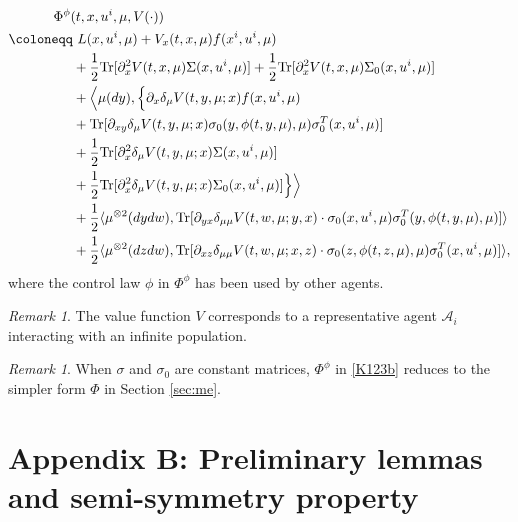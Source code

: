 \documentclass{amsart}
\theoremstyle{definition}
\theoremstyle{remark}
\newtheorem{remark}[theorem]{Remark}
\def\cal{\mathcal}
\numberwithin{equation}{section}
\begin{document}
\begin{align}
&\hskip -0.5cm \Phi^\phi(t, x, u^i,\mu,   V(\cdot) )\nonumber\\
  \coloneqq &\   L(x, u^i, \mu)+
 V_x (t, x, \mu)
f(x^i, u^i, \mu)\nonumber\\
& + \frac{1}{2} {\rm Tr}
[\partial^2_{x} V(t, x, \mu) \Sigma  (x,u^i,\mu  ) ]+ \frac{1}{2} {\rm Tr}
[\partial^2_{x} V(t, x, \mu) \Sigma_0  (x,u^i,\mu  ) ] \nonumber \\
&+\Big\langle \mu(dy), \Big\{ \partial_{x} \delta_\mu V(t, y, \mu; x) f(x,  u^i,\mu) \nonumber  \\
&  +{\rm Tr}[ \partial_{xy}\delta_\mu V(t,y,\mu;x)
\sigma_0(y, \phi(t,y,\mu),\mu)\sigma_0^T(x, u^i, \mu) ]\nonumber \\
& + \frac{1}{2} {\rm Tr} [\partial^2_{x} \delta_\mu V (t, y, \mu; x)\Sigma(x,u^i,\mu  )]\nonumber\\
& +  \frac{1}{2} {\rm Tr} [\partial_{x}^2 \delta_\mu V (t, y, \mu; x)\Sigma_0(x,u^i,\mu  )]\Big \}\Big\rangle\nonumber\\
&+\frac{1}{2} \langle \mu^{\otimes2}(dydw),
{\rm Tr}[\partial_{yx}\delta_{\mu\mu} V (t, w, \mu; y,x) \cdot
\sigma_0(x,u^i,\mu)\sigma^T_0(y,\phi(t,y,\mu),\mu)]\rangle \nonumber \\
&+\frac{1}{2}\langle \mu^{\otimes2}(dzdw), {\rm Tr}[\partial_{xz}\delta_{\mu\mu} V (t, w, \mu; x,z) \cdot \sigma_0(z,\phi(t,z,\mu),\mu)\sigma_0^T(x,u^i,\mu)]\rangle,\label{K123b}
\end{align}
where the control law $\phi$ in $\Phi^\phi$ has been used by other agents.







\begin{remark}
 The value function $V$ corresponds to a representative agent  ${\cal A}_i$ interacting with an infinite population.
  \end{remark}

\begin{remark}
When $\sigma$ and $\sigma_0$ are constant matrices, $\Phi^\phi$ in \eqref{K123b} reduces to the simpler form $\Phi$ in Section \ref{sec:me}.
\end{remark}



\section*{Appendix B: Preliminary lemmas and semi-symmetry property}
\renewcommand{\theequation}{B.\arabic{equation}}
\setcounter{equation}{0}
\renewcommand{\thetheorem}{B.\arabic{theorem}}
\setcounter{theorem}{0}
\renewcommand{\thesection}{B.\arabic{theorem}}
\setcounter{theorem}{0}
\renewcommand{\thesubsection}{B.\arabic{subsection}}
\setcounter{subsection}{0}
\end{document}

